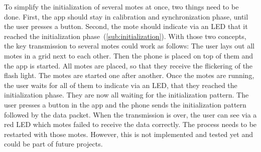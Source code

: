 \documentclass{sig-alternate} %
\begin{document}
To simplify the initialization of several motes at once, two things need to be done.
First, the app should stay in calibration and synchronization phase, until the user presses a button.
Second, the mote should indicate via an LED that it reached the initialization phase~(\ref{sub:initialization}).
With those two concepts, the key transmission to several motes could work as follows:
The user lays out all motes in a grid next to each other.
Then the phone is placed on top of them and the app is started.
All motes are placed, so that they receive the flickering of the flash light.
The motes are started one after another.
Once the motes are running, the user waits for all of them to indicate via an LED, that they reached the initialization phase.
They are now all waiting for the initialization pattern.
The user presses a button in the app and the phone sends the initialization pattern followed by the data packet.
When the transmission is over, the user can see via a red LED which motes failed to receive the data correctly.
The process needs to be restarted with those motes.
However, this is not implemented and tested yet and could be part of future projects.



\end{document}
